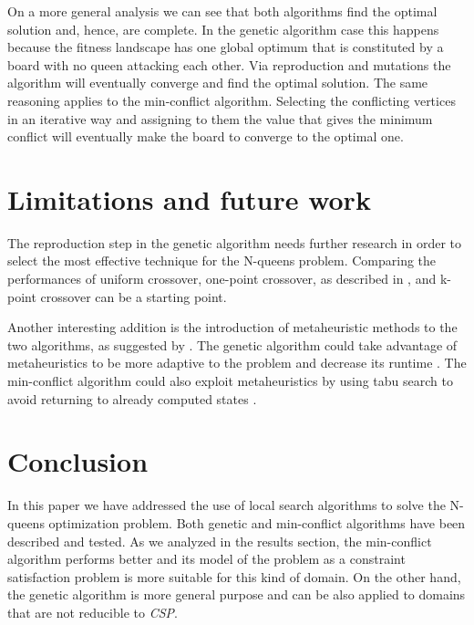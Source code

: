 \documentclass[runningheads]{llncs}
\begin{document}
On a more general analysis we can see that both algorithms find the
optimal solution and, hence, are complete. In the genetic algorithm
case this happens because the fitness landscape has one global optimum
that is constituted by a board with no queen attacking each other. Via
reproduction and mutations the algorithm will eventually converge and
find the optimal solution. The same reasoning applies to the
min-conflict algorithm. Selecting the conflicting vertices in an
iterative way and assigning to them the value that gives the minimum
conflict will eventually make the board to converge to the optimal
one.


\section{Limitations and future work}
The reproduction step in the genetic algorithm needs further research
in order to select the most effective technique for the N-queens
problem. Comparing the performances of uniform crossover, one-point crossover, as
described in \cite{russel2016artificial}, and k-point crossover can be
a starting point.

Another interesting addition is the introduction of metaheuristic
methods to the two algorithms, as suggested by
\cite{metaheuristic}. The genetic algorithm could take advantage of
metaheuristics to be more adaptive to the problem and decrease its
runtime \cite{adaptive_genetic}. The min-conflict algorithm could also
exploit metaheuristics by using tabu search to avoid returning to
already computed states \cite{russel2016artificial}.



\section{Conclusion}
In this paper we have addressed the use of local search algorithms to
solve the N-queens optimization problem. Both genetic and
min-conflict algorithms have been described and tested. As we analyzed in the
results section, the min-conflict algorithm performs better and its
model of the problem as a constraint satisfaction problem is more
suitable for this kind of domain. On the other hand, the genetic
algorithm is more general purpose and can be also applied to domains
that are not reducible to \textit{CSP}. 
\end{document}
